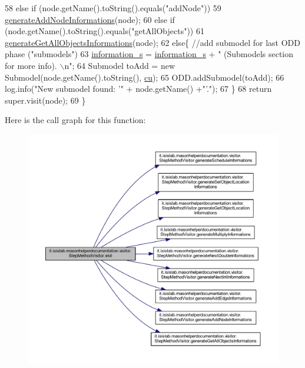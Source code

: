 \begin{DoxyCode}
58         \textcolor{keywordflow}{else} \textcolor{keywordflow}{if} (node.getName().toString().equals(\textcolor{stringliteral}{"addNode"}))
59             \hyperlink{classit_1_1isislab_1_1masonhelperdocumentation_1_1visitor_1_1_step_method_visitor_af1e379d214cb15623eab1e7dcdcf7526}{generateAddNodeInformations}(node);
60         \textcolor{keywordflow}{else} \textcolor{keywordflow}{if} (node.getName().toString().equals(\textcolor{stringliteral}{"getAllObjects"}))
61             \hyperlink{classit_1_1isislab_1_1masonhelperdocumentation_1_1visitor_1_1_step_method_visitor_aaa265bf4266e6eddf5d62a5285239cf9}{generateGetAllObjectsInformations}(node);
62         \textcolor{keywordflow}{else}\{   \textcolor{comment}{//add submodel for last ODD phase ("submodels")}
63             \hyperlink{classit_1_1isislab_1_1masonhelperdocumentation_1_1visitor_1_1_step_method_visitor_adf58f8f5068e330783c3c4bd78080f1a}{information\_s} = \hyperlink{classit_1_1isislab_1_1masonhelperdocumentation_1_1visitor_1_1_step_method_visitor_adf58f8f5068e330783c3c4bd78080f1a}{information\_s} + \textcolor{stringliteral}{" (Submodels section for more info).
      \(\backslash\)n"};
64             Submodel toAdd = \textcolor{keyword}{new} Submodel(node.getName().toString(), \hyperlink{classit_1_1isislab_1_1masonhelperdocumentation_1_1visitor_1_1_step_method_visitor_a2e892060825ccd1ba2382eb96b6d187a}{cu});
65             ODD.addSubmodel(toAdd);
66             log.info(\textcolor{stringliteral}{"New submodel found: '"} + node.getName() +\textcolor{stringliteral}{"'."});           
67         \}
68         \textcolor{keywordflow}{return} super.visit(node);
69     \}
\end{DoxyCode}


Here is the call graph for this function\-:
\nopagebreak
\begin{figure}[H]
\begin{center}
\leavevmode
\includegraphics[width=350pt]{classit_1_1isislab_1_1masonhelperdocumentation_1_1visitor_1_1_step_method_visitor_a5ec8cf0c38db7e8a67defaaf8bea6819_cgraph}
\end{center}
\end{figure}


